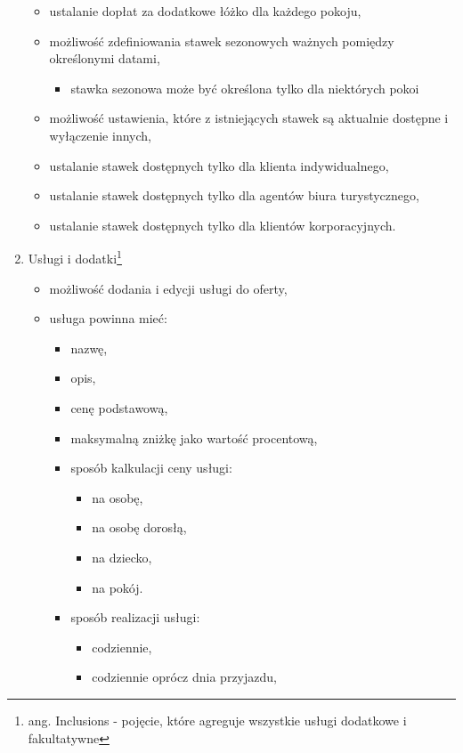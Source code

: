 \documentclass[a4paper,onecolumn,oneside,11pt,wide,floatssmall]{mwrep}
\theoremstyle{definition}
\theoremstyle{plain}%
\theoremstyle{remark}
\begin{document}
\begin{enumerate}
\begin{itemize}
      \item ustalanie dopłat za dodatkowe łóżko dla każdego pokoju,
      \item możliwość zdefiniowania stawek sezonowych ważnych pomiędzy określonymi datami,
        \begin{itemize}
          \item stawka sezonowa może być określona tylko dla niektórych pokoi
        \end{itemize}
      \item możliwość ustawienia, które z istniejących stawek są aktualnie dostępne i wyłączenie innych,
      \item ustalanie stawek dostępnych tylko dla klienta indywidualnego,
      \item ustalanie stawek dostępnych tylko dla agentów biura turystycznego,
      \item ustalanie stawek dostępnych tylko dla klientów korporacyjnych.
    \end{itemize}
  \item Usługi i dodatki\footnote{ang. Inclusions - pojęcie, które agreguje wszystkie usługi dodatkowe i fakultatywne}
    \begin{itemize}
      \item możliwość dodania i edycji usługi do oferty,
      \item usługa powinna mieć:
        \begin{itemize}
          \item nazwę,
          \item opis,
          \item cenę podstawową,
          \item maksymalną zniżkę jako wartość procentową,
          \item sposób kalkulacji ceny usługi:
            \begin{itemize}
              \item na osobę,
              \item na osobę dorosłą,
              \item na dziecko,
              \item na pokój.
            \end{itemize}
          \item sposób realizacji usługi:
            \begin{itemize}
              \item codziennie,
              \item codziennie oprócz dnia przyjazdu,

\end{itemize}
\end{itemize}
\end{itemize}
\end{enumerate}
\end{document}
